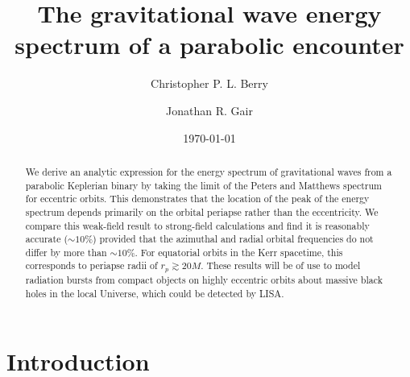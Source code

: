 \documentclass[aps,prd,amsfonts,amssymb,amsmath,nofootinbib,floatfix,reprint,showpacs,groupedaddress]{revtex4-1}
\begin{document}

\title{The gravitational wave energy spectrum of a parabolic encounter}

\author{Christopher P. L. Berry}
\author{Jonathan R. Gair}

\date{\today}

\begin{abstract}
We derive an analytic expression for the energy spectrum  of gravitational waves from a parabolic Keplerian binary by taking the limit of the Peters and Matthews spectrum for eccentric orbits. This demonstrates that the location of the peak of the energy spectrum depends primarily on the orbital periapse rather than the eccentricity. We compare this weak-field result to strong-field calculations and find it is reasonably accurate ($\sim10\%$) provided that the azimuthal and radial orbital frequencies do not differ by more than $\sim10\%$. For equatorial orbits in the Kerr spacetime, this corresponds to periapse radii of $r_{p} \gtrsim 20 M$. These results will be of use to model radiation bursts from compact objects on highly eccentric orbits about massive black holes in the local Universe, which could be detected by LISA.
\end{abstract}


\maketitle

\section{Introduction}
\end{document}
